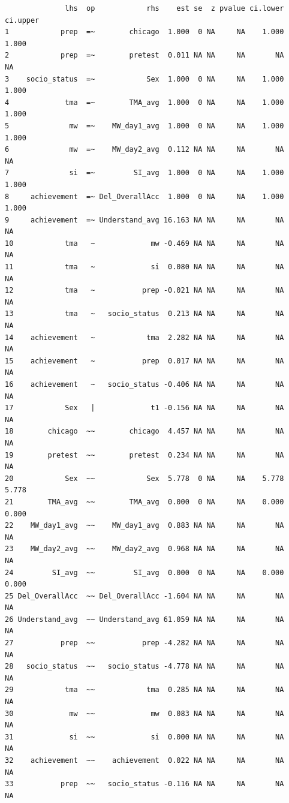 \documentclass[
  letterpaper,
  DIV=11,
  numbers=noendperiod]{scrartcl}
\begin{document}
\begin{verbatim}
              lhs  op            rhs    est se  z pvalue ci.lower ci.upper
1            prep  =~        chicago  1.000  0 NA     NA    1.000    1.000
2            prep  =~        pretest  0.011 NA NA     NA       NA       NA
3    socio_status  =~            Sex  1.000  0 NA     NA    1.000    1.000
4             tma  =~        TMA_avg  1.000  0 NA     NA    1.000    1.000
5              mw  =~    MW_day1_avg  1.000  0 NA     NA    1.000    1.000
6              mw  =~    MW_day2_avg  0.112 NA NA     NA       NA       NA
7              si  =~         SI_avg  1.000  0 NA     NA    1.000    1.000
8     achievement  =~ Del_OverallAcc  1.000  0 NA     NA    1.000    1.000
9     achievement  =~ Understand_avg 16.163 NA NA     NA       NA       NA
10            tma   ~             mw -0.469 NA NA     NA       NA       NA
11            tma   ~             si  0.080 NA NA     NA       NA       NA
12            tma   ~           prep -0.021 NA NA     NA       NA       NA
13            tma   ~   socio_status  0.213 NA NA     NA       NA       NA
14    achievement   ~            tma  2.282 NA NA     NA       NA       NA
15    achievement   ~           prep  0.017 NA NA     NA       NA       NA
16    achievement   ~   socio_status -0.406 NA NA     NA       NA       NA
17            Sex   |             t1 -0.156 NA NA     NA       NA       NA
18        chicago  ~~        chicago  4.457 NA NA     NA       NA       NA
19        pretest  ~~        pretest  0.234 NA NA     NA       NA       NA
20            Sex  ~~            Sex  5.778  0 NA     NA    5.778    5.778
21        TMA_avg  ~~        TMA_avg  0.000  0 NA     NA    0.000    0.000
22    MW_day1_avg  ~~    MW_day1_avg  0.883 NA NA     NA       NA       NA
23    MW_day2_avg  ~~    MW_day2_avg  0.968 NA NA     NA       NA       NA
24         SI_avg  ~~         SI_avg  0.000  0 NA     NA    0.000    0.000
25 Del_OverallAcc  ~~ Del_OverallAcc -1.604 NA NA     NA       NA       NA
26 Understand_avg  ~~ Understand_avg 61.059 NA NA     NA       NA       NA
27           prep  ~~           prep -4.282 NA NA     NA       NA       NA
28   socio_status  ~~   socio_status -4.778 NA NA     NA       NA       NA
29            tma  ~~            tma  0.285 NA NA     NA       NA       NA
30             mw  ~~             mw  0.083 NA NA     NA       NA       NA
31             si  ~~             si  0.000 NA NA     NA       NA       NA
32    achievement  ~~    achievement  0.022 NA NA     NA       NA       NA
33           prep  ~~   socio_status -0.116 NA NA     NA       NA       NA

\end{verbatim}
\end{document}
